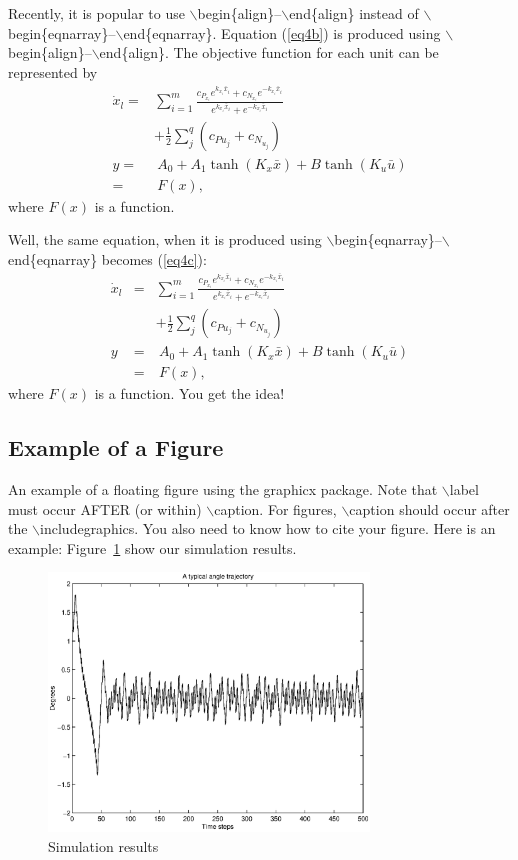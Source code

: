 \documentclass[conference]{IEEEtran}
\begin{document}
Recently, it is popular to use
$\backslash$begin\{align\}--$\backslash$end\{align\}
instead of
$\backslash$begin\{eqnarray\}--$\backslash$end\{eqnarray\}.
Equation (\ref{eq4b}) is produced using 
$\backslash$begin\{align\}--$\backslash$end\{align\}.
The objective function for each unit can be represented by
\begin{align}
\dot {x}_l=& \sum_{i = 1}^m {\frac{c_{P_{x_i} } e^{k_{x_i}\bar{x}_i} + c_{N_{x_i} }
e^{ -  k_{x_i} \bar{x}_i}}{e^{k_{x_i} \bar{x}_i} + e^{ - k_{x_i} \bar{x}_i}}} \nonumber\\
& + \frac{1}{2}\sum\limits_j^q (c_{P{u_j }} + c_{N _{u_j }} ) \nonumber\\
y=& \ A_0 + A_1 \tanh (K_x \bar {x}) + B\tanh (K_u \bar {u}) \nonumber\\
 =& \ F(x),\label{eq4b}
\end{align}
where $F(x)$ is a function.

Well, the same equation, when it is produced using 
$\backslash$begin\{eqnarray\}--$\backslash$end\{eqnarray\} becomes
(\ref{eq4c}):
\begin{eqnarray}
\dot {x}_l&=& \sum_{i = 1}^m {\frac{c_{P_{x_i} } e^{k_{x_i}\bar{x}_i} + c_{N_{x_i} }
e^{ - k_{x_i} \bar{x}_i}}{e^{k_{x_i} \bar{x}_i} + e^{ - k_{x_i} \bar{x}_i}}} \nonumber\\
&&+ \frac{1}{2}\sum\limits_j^q (c_{P{u_j }} + c_{N _{u_j }} ) \nonumber\\
y&=& \ A_0 + A_1 \tanh (K_x \bar {x}) + B\tanh (K_u \bar {u})\nonumber\\
&=& \ F(x),\label{eq4c}
\end{eqnarray}
where $F(x)$ is a function. You get the idea!

\subsection{Example of a Figure}
An example of a floating figure using the graphicx package.
Note that $\backslash$label must occur AFTER (or within) $\backslash$caption.
For figures, $\backslash$caption should occur after the 
$\backslash$includegraphics.
You also need to know how to cite your figure. Here is an example:
Figure~\ref{fig_sim} show our simulation results.

\begin{figure}[htp]
\centerline{\includegraphics[width=3.35in]{fig1.eps}}
\caption{Simulation results}
\label{fig_sim}
\end{figure}
\end{document}
